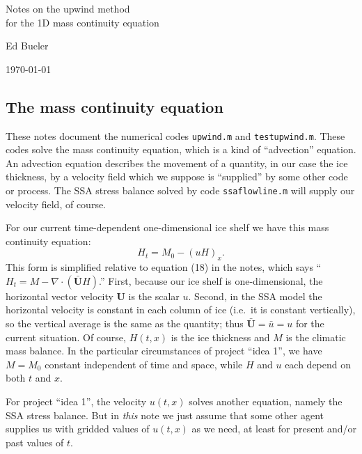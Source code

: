 \documentclass[titlepage,a4paper,final,12pt]{scrartcl}
\newcommand{\Div}{\nabla\cdot}
\begin{document}
  \begin{center}
    \vspace{3cm}
    {\Large{} Notes on the upwind method \\ for the 1D mass continuity equation}
    \vspace{1cm}

    {\large Ed Bueler}

    \vspace{0.5cm}
    \today
    \vspace{1cm}
  \end{center}


\subsection*{The mass continuity equation}   These notes document the numerical codes \texttt{upwind.m} and \texttt{testupwind.m}.  These codes solve the mass continuity equation, which is a kind of ``advection'' equation.  An advection equation describes the movement of a quantity, in our case the ice thickness, by a velocity field which we suppose is ``supplied'' by some other code or process.  The SSA stress balance solved by code \texttt{ssaflowline.m} will supply our velocity field, of course.

For our current time-dependent one-dimensional ice shelf we have this mass continuity equation:
\begin{equation}
  H_t = M_0 - (u H)_x.  \label{mc}
\end{equation}
This form is simplified relative to equation (18) in the notes, which says ``$H_t = M - \Div \left(\bar{\mathbf{U}} H\right)$.''  First, because our ice shelf is one-dimensional, the horizontal vector velocity $\mathbf{U}$ is the scalar $u$.  Second, in the SSA model the horizontal velocity is constant in each column of ice (i.e.~it is constant vertically), so the vertical average is the same as the quantity; thus $\bar{\mathbf{U}} = \bar{u} = u$ for the current situation.  Of course, $H(t,x)$ is the ice thickness and $M$ is the climatic mass balance.  In the particular circumstances of project ``idea 1'', we have $M=M_0$ constant independent of time and space, while $H$ and $u$ each depend on both $t$ and $x$.

For project ``idea 1'', the velocity $u(t,x)$ solves another equation, namely the SSA stress balance.  But in \emph{this} note we just assume that some other agent supplies us with gridded values of $u(t,x)$ as we need, at least for present and/or past values of $t$.
\end{document}
